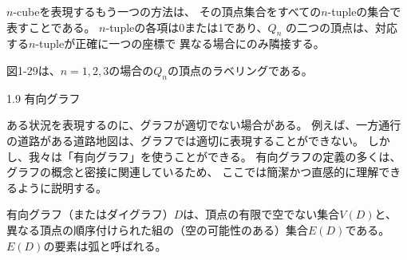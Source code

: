 
$n$-cubeを表現するもう一つの方法は、
その頂点集合をすべての$n$-tupleの集合で表すことである。
$n$-tupleの各項は0または1であり、$Q_n$
の二つの頂点は、対応する$n$-tupleが正確に一つの座標で
異なる場合にのみ隣接する。

図1-29は、$n=1, 2, 3$の場合の$Q_n$の頂点のラベリングである。

1.9 有向グラフ

ある状況を表現するのに、グラフが適切でない場合がある。
例えば、一方通行の道路がある道路地図は、グラフでは適切に表現することができない。
しかし、我々は「有向グラフ」を使うことができる。
有向グラフの定義の多くは、グラフの概念と密接に関連しているため、
ここでは簡潔かつ直感的に理解できるように説明する。

有向グラフ（またはダイグラフ）$D$は、頂点の有限で空でない集合$V(D)$と、
異なる頂点の順序付けられた組の（空の可能性のある）集合$E(D)$である。$E(D)$の要素は弧と呼ばれる。